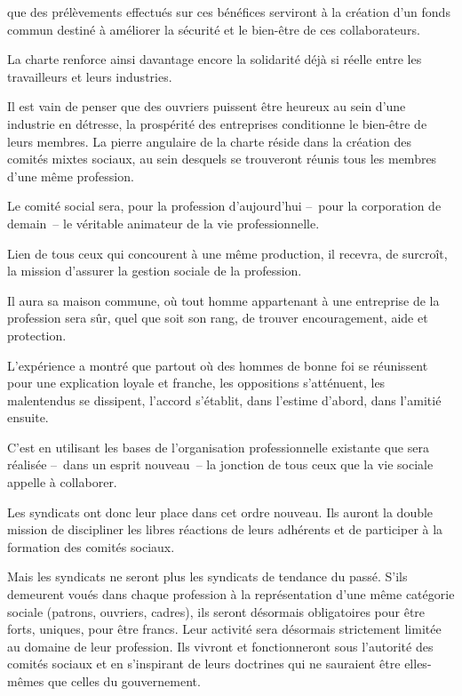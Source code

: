 \documentclass[french,twoside]{book} %
\begin{document}
que des prélèvements effectués sur ces bénéfices serviront à la création d’un fonds commun destiné à améliorer la sécurité et le bien-être de ces collaborateurs.\par
La charte renforce ainsi davantage encore la solidarité déjà si réelle entre les travailleurs et leurs industries.\par
Il est vain de penser que des ouvriers puissent être heureux au sein d’une industrie en détresse, la prospérité des entreprises conditionne le bien-être de leurs membres. La pierre angulaire de la charte réside dans la création des comités mixtes sociaux, au sein desquels se trouveront réunis tous les membres d’une même profession.\par
Le comité social sera, pour la profession d’aujourd’hui – pour la corporation de demain – le véritable animateur de la vie professionnelle.\par
Lien de tous ceux qui concourent à une même production, il recevra, de surcroît, la mission d’assurer la gestion sociale de la profession.\par
Il aura sa maison commune, où tout homme appartenant à une entreprise de la profession sera sûr, quel que soit son rang, de trouver encouragement, aide et protection.\par
L’expérience a montré que partout où des hommes de bonne foi se réunissent pour une explication loyale et franche, les oppositions s’atténuent, les malentendus se dissipent, l’accord s’établit, dans l’estime d’abord, dans l’amitié ensuite.\par
C’est en utilisant les bases de l’organisation professionnelle existante que sera réalisée – dans un esprit nouveau – la jonction de tous ceux que la vie sociale appelle à collaborer.\par
Les syndicats ont donc leur place dans cet ordre nouveau. Ils auront la double mission de discipliner les libres réactions de leurs adhérents et de participer à la formation des comités sociaux.\par
Mais les syndicats ne seront plus les syndicats de tendance du passé. S’ils demeurent voués dans chaque profession à la représentation d’une même catégorie sociale (patrons, ouvriers, cadres), ils seront désormais obligatoires pour être forts, uniques, pour être francs. Leur activité sera désormais strictement limitée au domaine de leur profession. Ils vivront et fonctionneront sous l’autorité des comités sociaux et en s’inspirant de leurs doctrines qui ne sauraient être elles-mêmes que celles du gouvernement.\par
\end{document}

